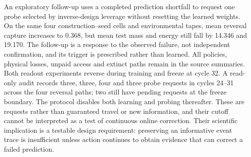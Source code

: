 An exploratory follow-up uses a completed prediction shortfall to request one probe selected by inverse-design leverage without resetting the learned weights. On the same four construction--seed cells and environmental tapes, mean reversal capture increases to 0.368, but mean test mass and energy still fall by 14.346 and 19.170. The follow-up is a response to the observed failure, not independent confirmation, and its trigger is prescribed rather than learned. All policies, physical losses, unpaid access and extinct paths remain in the source summaries. Both readout experiments reverse during training and freeze at cycle 32. A read-only audit records three, three, four and three probe requests in cycles 24--31 across the four reversal paths; two still have pending requests at the freeze boundary. The protocol disables both learning and probing thereafter. These are requests rather than guaranteed travel or new information, and their cutoff cannot be interpreted as a test of continuous online correction. Their scientific implication is a testable design requirement: preserving an informative event trace is insufficient unless action continues to obtain evidence that can correct a failed prediction.
